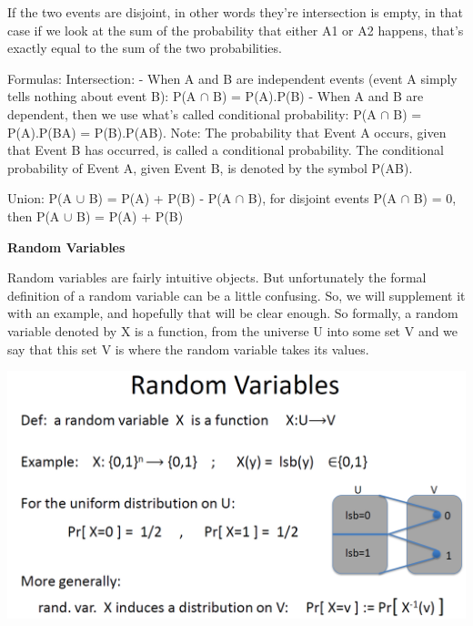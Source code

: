 \documentclass[11pt]{article}
\makeatletter
\def\maxwidth{\ifdim\Gin@nat@width>\linewidth\linewidth
    \else\Gin@nat@width\fi}
\let\Oldincludegraphics\includegraphics
\renewcommand{\includegraphics}[1]{\Oldincludegraphics[width=.8\maxwidth]{#1}}
\makeatother
\begin{document}
If the two events are disjoint, in other words they're intersection is
empty, in that case if we look at the sum of the probability that either
A1 or A2 happens, that's exactly equal to the sum of the two
probabilities.

Formulas: Intersection: - When A and B are independent events (event A
simply tells nothing about event B): P(A \(\cap\) B) = P(A).P(B) - When
A and B are dependent, then we use what's called conditional
probability: P(A \(\cap\) B) = P(A).P(B\textbar{}A) =
P(B).P(A\textbar{}B). Note: The probability that Event A occurs, given
that Event B has occurred, is called a conditional probability. The
conditional probability of Event A, given Event B, is denoted by the
symbol P(A\textbar{}B).

Union: P(A \(\cup\) B) = P(A) + P(B) - P(A \(\cap\) B), for disjoint
events P(A \(\cap\) B) = 0, then P(A \(\cup\) B) = P(A) + P(B)

\textbf{Random Variables}

Random variables are fairly intuitive objects. But unfortunately the
formal definition of a random variable can be a little confusing. So, we
will supplement it with an example, and hopefully that will be clear
enough. So formally, a random variable denoted by X is a function, from
the universe U into some set V and we say that this set V is where the
random variable takes its values.

\includegraphics{./Images/RandomVariables.png}
\end{document}

